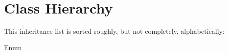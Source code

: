 \section{Class Hierarchy}
This inheritance list is sorted roughly, but not completely, alphabetically\+:\begin{DoxyCompactList}
\item {}
\item Enum\begin{DoxyCompactList}
\item {}
\end{DoxyCompactList}
\end{DoxyCompactList}
